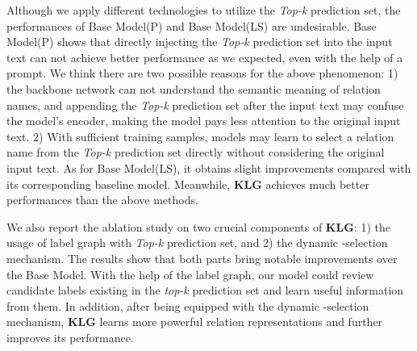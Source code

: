 Although we apply different technologies to utilize the \textit{Top-k} prediction set, the performances of Base Model(P) and Base Model(LS) are undesirable. Base Model(P) shows that directly injecting the \textit{Top-k} prediction set into the input text can not achieve better performance as we expected, even with the help of a prompt. We think there are two possible reasons for the above phenomenon: 1) the backbone network can not understand the semantic meaning of relation names, and appending the \textit{Top-k} prediction set after the input text may confuse the model's encoder, making the model pays less attention to the original input text. 2) With sufficient training samples, models may learn to select a relation name from the \textit{Top-k} prediction set directly without considering the original input text. As for Base Model(LS), it obtains slight improvements compared with its corresponding baseline model. Meanwhile, \textbf{KLG} achieves much better performances than the above methods. 

We also report the ablation study on two crucial components of \textbf{KLG}: 1) the usage of label graph with \textit{Top-k} prediction set, and 2) the dynamic -selection mechanism. The results show that both parts bring notable improvements over the Base Model. With the help of the label graph, our model could review candidate labels existing in the \textit{top-k} prediction set and learn useful information from them. In addition, after being equipped with the dynamic -selection mechanism, \textbf{KLG} learns more powerful relation representations and further improves its performance.

